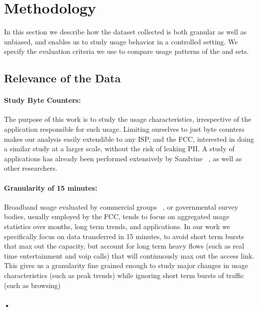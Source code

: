 \section{Methodology}
\label{sec:methodology}

In this section we describe how the dataset collected is both granular as well as unbiased, and enables us to study usage behavior in a controlled setting. We specify the evaluation criteria we use to compare usage patterns of the \test and \control sets.

\subsection{Relevance of the Data}

\paragraph{Study Byte Counters:} The purpose of this work is to study the usage characteristics, irrespective of the application responsible for such usage. 
Limiting ourselves to just byte counters makes our analysis easily extendible to any ISP, and the FCC, interested in doing a similar study at a larger scale, without the risk of leaking PII. A study of applications has already been performed extensively by Sandvine ~\cite{}, as well as other researchers.

\paragraph{Granularity of 15 minutes:} Broadband usage evaluated by commercial groups ~\cite{}, or governmental survey bodies, usually employed by the FCC, tends to focus on aggregated usage statistics over months, long term trends, and applications. In our work we specifically focus on data transferred in 15 minutes, to avoid short term bursts that max out the capacity, but account for long term heavy flows (such as real time entertainment and voip calls) that will continuously max out the access link. This gives us a granularity fine grained enough to study major changes in usage characteristics (such as peak trends) while ignoring short term bursts of traffic (such as browsing)


\paragraph{•}

